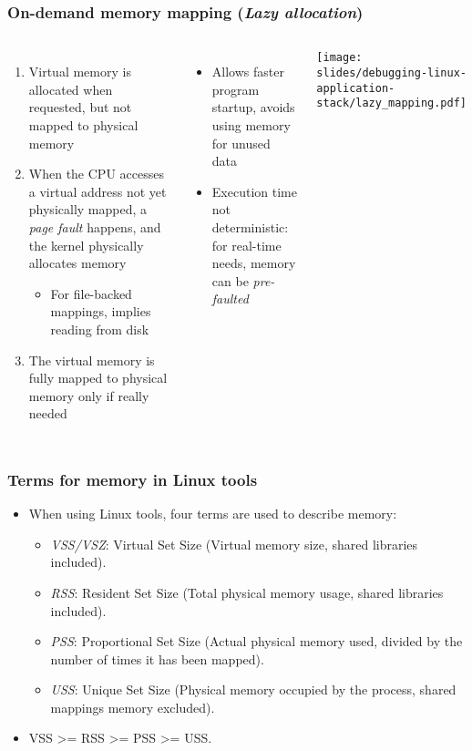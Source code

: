 \begin{frame}[fragile]
  \frametitle{On-demand memory mapping ({\em Lazy allocation})}
  \begin{columns}
    \begin{enumerate}
      \item Virtual memory is allocated when requested, but not mapped to
        physical memory
      \item When the CPU accesses a virtual address not yet physically
        mapped, a {\em page fault} happens, and the kernel physically
        allocates memory
    \begin{itemize}
      \item For file-backed mappings, implies reading from disk
    \end{itemize}
      \item The virtual memory is fully mapped to physical memory only if
        really needed
    \end{enumerate}
    \begin{itemize}
      \item Allows faster program startup, avoids using memory for unused
        data
      \item Execution time not deterministic: for real-time needs, memory
        can be {\em pre-faulted}
    \end{itemize}
    \texttt{[image: slides/debugging-linux-application-stack/lazy\_mapping.pdf]}
  \end{columns}
\end{frame}

\begin{frame}[fragile]
  \frametitle{Terms for memory in Linux tools}
  \begin{itemize}
    \item When using Linux tools, four terms are used to describe memory:
    \begin{itemize}
      \item {\em VSS/VSZ}: Virtual Set Size (Virtual memory size, shared libraries
            included).
      \item {\em RSS}: Resident Set Size (Total physical memory usage, shared
            libraries included).
      \item {\em PSS}: Proportional Set Size (Actual physical memory used, divided
            by the number of times it has been mapped).
      \item {\em USS}: Unique Set Size (Physical memory occupied by the process,
            shared mappings memory excluded).
    \end{itemize}
    \item VSS >= RSS >= PSS >= USS.
  \end{itemize}
\end{frame}

